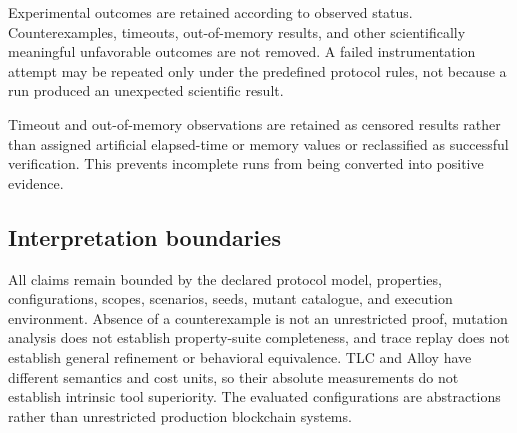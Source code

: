 Experimental outcomes are retained according to observed status.
Counterexamples, timeouts, out-of-memory results, and other scientifically
meaningful unfavorable outcomes are not removed. A failed instrumentation
attempt may be repeated only under the predefined protocol rules, not because a
run produced an unexpected scientific result.

Timeout and out-of-memory observations are retained as censored results rather
than assigned artificial elapsed-time or memory values or reclassified as
successful verification. This prevents incomplete runs from being converted
into positive evidence.

\subsection{Interpretation boundaries}
\label{subsec:method-boundaries}

All claims remain bounded by the declared protocol model, properties,
configurations, scopes, scenarios, seeds, mutant catalogue, and execution
environment. Absence of a counterexample is not an unrestricted proof,
mutation analysis does not establish property-suite completeness, and trace
replay does not establish general refinement or behavioral equivalence. TLC and
Alloy have different semantics and cost units, so their absolute measurements
do not establish intrinsic tool superiority. The evaluated configurations are
abstractions rather than unrestricted production blockchain systems.
